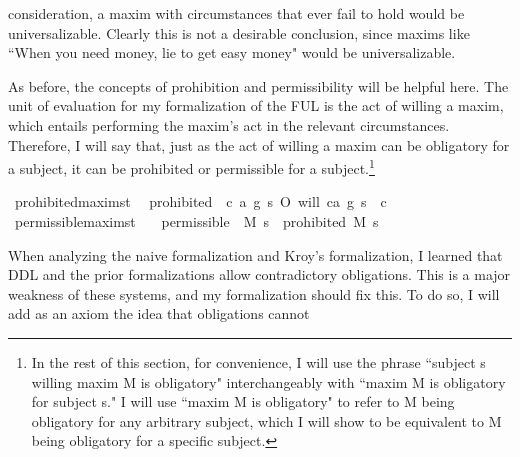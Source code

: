 \begin{isabellebody}
{consideration, a maxim with circumstances that ever fail to hold would be universalizable. Clearly 
this is not a desirable conclusion, since maxims like ``When you need money, lie to get easy money"
would be universalizable.%
}%
\begin{isamarkuptext}%
As before, the concepts of prohibition and permissibility will be helpful here. The unit of 
evaluation for my formalization of the FUL is the act of willing a maxim, which entails performing 
the maxim's act in the relevant circumstances. Therefore, I will say that, just as the act of willing a
 maxim can be obligatory for a subject, it can be prohibited or permissible for a subject.\footnote{In 
the rest of this section, for convenience, I will use the phrase ``subject s willing maxim M is obligatory" 
interchangeably with ``maxim M is obligatory for subject s." I will use ``maxim M is obligatory" to 
refer to M being obligatory for any arbitrary subject, which I will show to be equivalent to M being 
obligatory for a specific subject.}%
\end{isamarkuptext}\isamarkuptrue%
\isamarkupfalse%
\ prohibited{\isacharcolon}{\isacharcolon}{\isachardoublequoteopen}maxim{\isasymRightarrow}s{\isasymRightarrow}t{\isachardoublequoteclose}\ \ \isanewline
{\isachardoublequoteopen}prohibited\ {\isasymequiv}\ {\isasymlambda}{\isacharparenleft}c{\isacharcomma}\ a{\isacharcomma}\ g{\isacharparenright}\ s{\isachardot}\ O{\isacharbraceleft}\isactrlbold {\isasymnot}\ {\isacharparenleft}will\ {\isacharparenleft}c{\isacharcomma}a{\isacharcomma}\ g{\isacharparenright}\ s{\isacharparenright}\ {\isacharbar}\ c{\isacharbraceright}{\isachardoublequoteclose}\isanewline
\isanewline
{}\isamarkupfalse%
\ permissible{\isacharcolon}{\isacharcolon}{\isachardoublequoteopen}maxim{\isasymRightarrow}s{\isasymRightarrow}t{\isachardoublequoteclose}\isanewline
\ \ \ {\isachardoublequoteopen}permissible\ {\isasymequiv}\ {\isasymlambda}M\ s{\isachardot}\ \isactrlbold {\isasymnot}\ {\isacharparenleft}prohibited\ M\ s{\isacharparenright}{\isachardoublequoteclose}\isanewline
%
%
\begin{isamarkuptext}%
When analyzing the naive formalization and Kroy's formalization, I learned that DDL and the prior 
formalizations allow contradictory obligations. This is a major weakness of these systems, and my 
formalization should fix this. To do so, I will add as an axiom the idea that obligations cannot 

\end{isamarkuptext}
\end{isabellebody}
